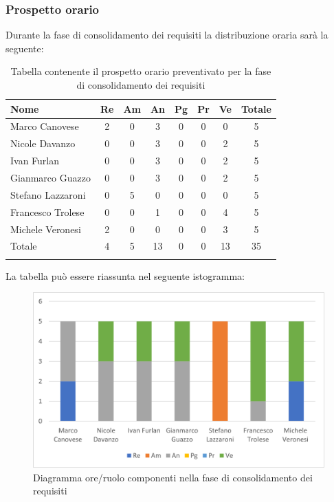             \subsubsection{Prospetto orario}
			Durante la fase di consolidamento dei requisiti la distribuzione oraria sarà la seguente:
			
			\begin{longtable}{|l|c|c|c|c|c|c|c|}
				\hline
				\rowcolor{lighter-grayer}
				\textbf{Nome} & \textbf{Re} & \textbf{Am} & \textbf{An} & \textbf{Pg}  & \textbf{Pr}   & \textbf{Ve} & \textbf{Totale} \\
				\hline
				\endfirsthead
				
				\hline
				Marco Canovese & 2 & 0 & 3 & 0 & 0 & 0 & 5\\
				\hline
				\hline
				Nicole Davanzo & 0 & 0 & 3 & 0 & 0 & 2 & 5\\
				\hline
				\hline
				Ivan Furlan & 0 & 0 & 3 & 0 & 0 & 2 & 5\\
				\hline
				\hline
				Gianmarco Guazzo & 0 & 0 & 3 & 0 & 0 & 2 & 5\\
				\hline
				\hline
				Stefano Lazzaroni & 0 & 5 & 0 & 0 & 0 & 0 & 5\\
				\hline
				\hline
				Francesco Trolese & 0 & 0 & 1 & 0 & 0 & 4 & 5\\
				\hline
				\hline
				Michele Veronesi & 2 & 0 & 0 & 0 & 0 & 3 & 5\\
				\hline 
				\hline
				Totale & 4 & 5 & 13 & 0 & 0 & 13 & 35\\
				\hline 
				\rowcolor{white}
				\caption{Tabella contenente il prospetto orario preventivato per la fase di consolidamento dei requisiti}
			\end{longtable}

		
			La tabella può essere riassunta nel seguente istogramma:
		
			\begin{figure}[H]
				\centering
				\includegraphics[width=0.8\linewidth]{res/images/preventivo/2-1.png}
				\caption{Diagramma ore/ruolo componenti nella fase di consolidamento dei requisiti}
				\label{fig:diagramma suddivisione ruoli fase conslidamento dei requisiti}
			\end{figure}
		
